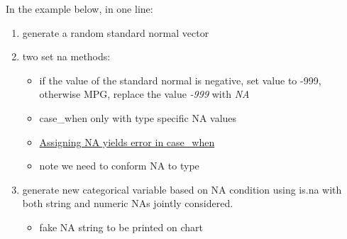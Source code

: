 \documentclass[
]{book}
\providecommand{\tightlist}{%
  \setlength{\itemsep}{0pt}\setlength{\parskip}{0pt}}
\begin{document}
In the example below, in one line:

\begin{enumerate}
\def\labelenumi{\arabic{enumi}.}
\tightlist
\item
  generate a random standard normal vector
\item
  two set na methods:

  \begin{itemize}
  \tightlist
  \item
    if the value of the standard normal is negative, set value to -999, otherwise MPG, replace the value \emph{-999} with \emph{NA}
  \item
    case\_when only with type specific NA values
  \item
    \href{https://github.com/tidyverse/dplyr/issues/3202\#issuecomment-343601409}{Assigning NA yields error in case\_when}
  \item
    note we need to conform NA to type
  \end{itemize}
\item
  generate new categorical variable based on NA condition using is.na with both string and numeric NAs jointly considered.

  \begin{itemize}
  \tightlist
  \item
    fake NA string to be printed on chart
  \end{itemize}
\end{enumerate}
\end{document}
